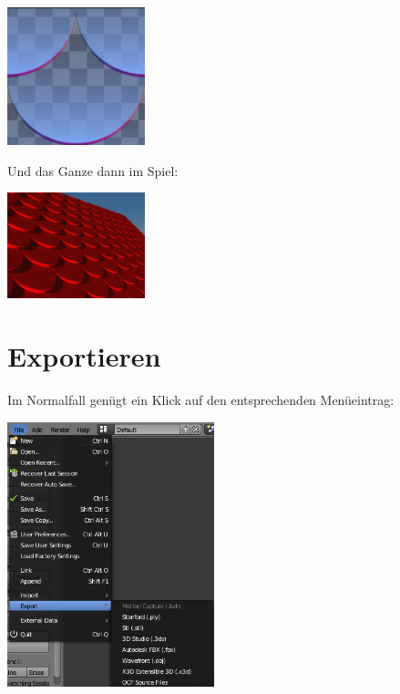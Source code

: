 \documentclass[a4paper]{article}
\begin{document}
\begin{center}
\includegraphics[width=40mm]{../images/blender/bumpmap.png}
\end{center}

Und das Ganze dann im Spiel:
\begin{center}
\includegraphics[width=40mm]{../images/blender/bumpmap-ingame.png}
\end{center}

\section{Exportieren}
Im Normalfall genügt ein Klick auf den entsprechenden Menüeintrag:

\begin{center}
\includegraphics[width=60mm]{../images/blender/blender-menu.png}
\end{center}
\end{document}
